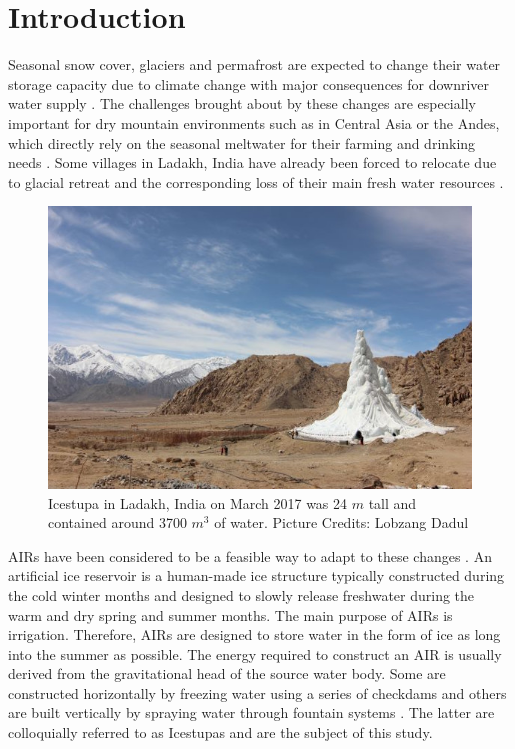 \documentclass[utf8]{frontiersSCNS} %
\begin{document}
\section{Introduction}

Seasonal snow cover, glaciers and permafrost are expected to change their water storage capacity due to climate change
with major consequences for downriver water supply \citep{Immerzeel_2020}. The challenges brought about by these
changes are especially important for dry mountain environments such as in Central Asia or the Andes, which directly
rely on the seasonal meltwater for their farming and drinking needs \citep{HoelzleBarandun_2019, Apel_2018,
Buytaert_2017, Chen_2016, UNGERSHAYESTEH_2013}. Some villages in Ladakh, India have already been forced to relocate
due to glacial retreat and the corresponding loss of their main fresh water resources \citep{zanskar}. 

\begin{figure} \begin{center} \includegraphics[width=10 cm]{Figures/Figure_1.jpg}
\end{center} \caption{Icestupa in Ladakh, India on March 2017 was 24 $m$ tall and contained around 3700 $m^3$ 
of water. Picture Credits: Lobzang Dadul} \label{fig:cone} \end{figure}

AIRs have been considered to be a feasible way to adapt to these changes \citep{IPCC_2019,
10.1659/MRD-JOURNAL-D-18-00072.1}. An artificial ice reservoir is a human-made ice structure typically constructed
during the cold winter months and designed to slowly release freshwater during the warm and dry spring and summer
months. The main purpose of AIRs is irrigation. Therefore, AIRs are designed to store water in the form of ice as long
into the summer as possible. The energy required to construct an AIR is usually derived from the gravitational head of
the source water body. Some are constructed horizontally by freezing water using a series of checkdams and others are
built vertically by spraying water through fountain systems \citep{Nusser_2018}. The latter are colloquially referred
to as Icestupas and are the subject of this study.
\end{document}
